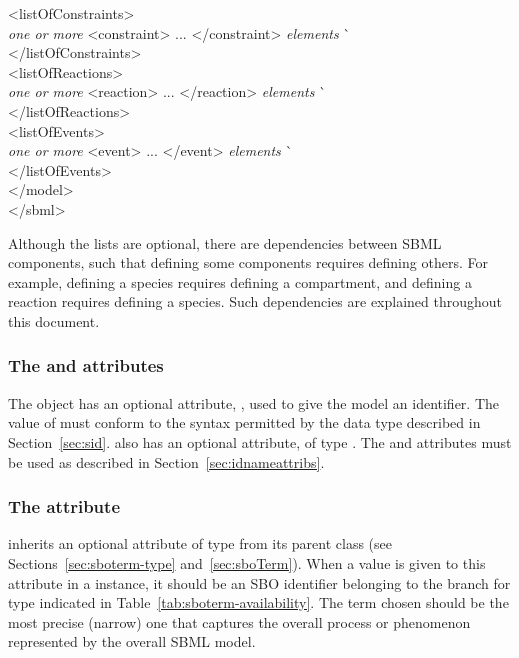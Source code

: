 \begin{tt}
\begin{tabbing}
\>\><listOfConstraints>\\
\>\>\>\textrm{\emph{one or more}} <constraint> ... </constraint> \textrm{\emph{elements}}  \` \sayOptional\\
\>\></listOfConstraints>\\
\>\><listOfReactions>\\
\>\>\>\textrm{\emph{one or more}} <reaction> ... </reaction> \textrm{\emph{elements}}  \` \sayOptional\\
\>\></listOfReactions>\\
\>\><listOfEvents>\\
\>\>\>\textrm{\emph{one or more}} <event> ... </event> \textrm{\emph{elements}}  \` \sayOptional\\
\>\></listOfEvents>\\
\></model>\\
</sbml>
\end{tabbing}
\regularspacing
\end{tt}
\vspace*{2ex}

Although the lists are optional, there are dependencies between
SBML components, such that defining some components requires
defining others.  For example, defining a species requires
defining a compartment, and defining a reaction requires defining
a species.  Such dependencies are explained throughout this
document.
  

\subsubsection{The  and  attributes}
\label{sec:model-id}

The \Model object has an optional attribute, , used to
give the model an identifier.  The value of  must
conform to the syntax permitted by the  data type
described in Section~\ref{sec:sid}.  \Model also has an optional
 attribute, of type .  The
 and  attributes must be used as described
in Section~\ref{sec:idnameattribs}.


\subsubsection{The  attribute}
\label{sec:model-sboterm}

\Model inherits an optional 
attribute of type  from its parent
class \SBase (see Sections~\ref{sec:sboterm-type}
and~\ref{sec:sboTerm}).  When a value is given to this
attribute in a \Model instance, it should be an
SBO identifier belonging to the branch for type \Model 
indicated in Table~\ref{tab:sboterm-availability}. 
The term chosen should be the most precise (narrow)
one that captures the overall process or phenomenon represented
by the overall SBML model.

